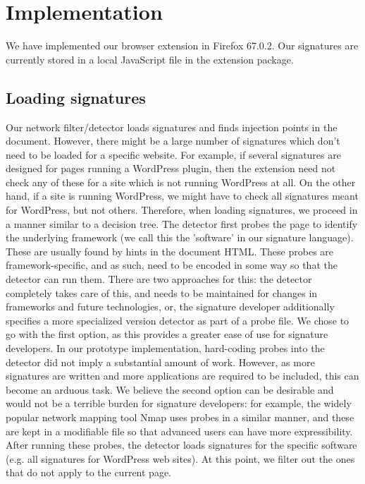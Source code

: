 \section{Implementation}

We have implemented our browser extension in Firefox 67.0.2. Our signatures are currently stored in a local JavaScript file in the extension package.

\subsection{Loading signatures}
Our network filter/detector loads signatures and finds injection points in the document. However, there might be a large number of signatures which don't need to be loaded for a specific website. For example, if several signatures are designed for pages running a WordPress plugin, then the extension need not check any of these for a site which is not running WordPress at all. On the other hand, if a site is running WordPress, we might have to check all signatures meant for WordPress, but not others. Therefore, when loading signatures, we proceed in a manner similar to a decision tree. The detector first probes the page to identify the underlying framework (we call this the 'software' in our signature language). These are usually found by hints in the document HTML. These probes are framework-specific, and as such, need to be encoded in some way so that the detector can run them. There are two approaches for this: the detector completely takes care of this, and needs to be maintained for changes in frameworks and future technologies, or, the signature developer additionally specifies a more specialized version detector as part of a probe file. We chose to go with the first option, as this provides a greater ease of use for signature developers. In our prototype implementation, hard-coding probes into the detector did not imply a substantial amount of work. However, as more signatures are written and more applications are required to be included, this can become an arduous task. We believe the second option can be desirable and would not be a terrible burden for signature developers: for example, the widely popular network mapping tool Nmap \cite{nMap} uses probes in a similar manner, and these are kept in a modifiable file so that advanced users can have more expressibility. After running these probes, the detector loads signatures for the specific software (e.g. all signatures for WordPress web sites). At this point, we filter out the ones that do not apply to the current page.

